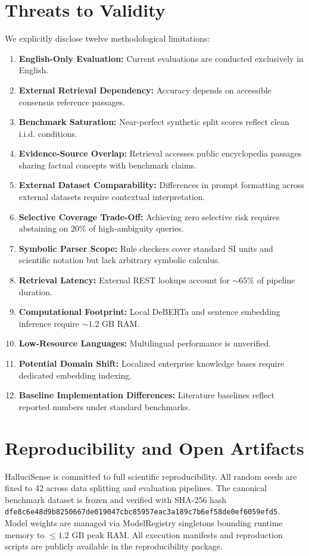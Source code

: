 \documentclass[11pt,a4paper]{article}
\begin{document}
\section{Threats to Validity}
\label{sec:threats_to_validity}
We explicitly disclose twelve methodological limitations:
\begin{enumerate}
    \item \textbf{English-Only Evaluation:} Current evaluations are conducted exclusively in English.
    \item \textbf{External Retrieval Dependency:} Accuracy depends on accessible consensus reference passages.
    \item \textbf{Benchmark Saturation:} Near-perfect synthetic split scores reflect clean i.i.d. conditions.
    \item \textbf{Evidence-Source Overlap:} Retrieval accesses public encyclopedia passages sharing factual concepts with benchmark claims.
    \item \textbf{External Dataset Comparability:} Differences in prompt formatting across external datasets require contextual interpretation.
    \item \textbf{Selective Coverage Trade-Off:} Achieving zero selective risk requires abstaining on $20\%$ of high-ambiguity queries.
    \item \textbf{Symbolic Parser Scope:} Rule checkers cover standard SI units and scientific notation but lack arbitrary symbolic calculus.
    \item \textbf{Retrieval Latency:} External REST lookups account for $\sim 65\%$ of pipeline duration.
    \item \textbf{Computational Footprint:} Local DeBERTa and sentence embedding inference require $\sim 1.2\text{ GB}$ RAM.
    \item \textbf{Low-Resource Languages:} Multilingual performance is unverified.
    \item \textbf{Potential Domain Shift:} Localized enterprise knowledge bases require dedicated embedding indexing.
    \item \textbf{Baseline Implementation Differences:} Literature baselines reflect reported numbers under standard benchmarks.
\end{enumerate}

\section{Reproducibility and Open Artifacts}
\label{sec:reproducibility}
HalluciSense is committed to full scientific reproducibility. All random seeds are fixed to 42 across data splitting and evaluation pipelines. The canonical benchmark dataset is frozen and verified with SHA-256 hash \texttt{dfe8c6e48d9b8250667de019047cbc85957eac3a189c7b6ef58de0ef6059efd5}. Model weights are managed via ModelRegistry singletons bounding runtime memory to $\le 1.2\text{ GB}$ peak RAM. All execution manifests and reproduction scripts are publicly available in the reproducibility package.
\end{document}
